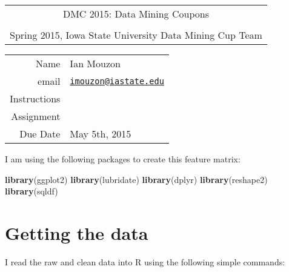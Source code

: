 \documentclass[10pt]{report}
\newenvironment{Shaded}{}{}
\newcommand{\KeywordTok}[1]{\textcolor[rgb]{0.00,0.44,0.13}{\textbf{{#1}}}}
\newcommand{\NormalTok}[1]{{#1}}
\begin{document}
\thispagestyle{empty}%
\begin{center}%
    \renewcommand{\arraystretch}{1.5}%
    \begin{tabular}{c}%
       \Large{DMC 2015: Data Mining Coupons}\\
       \\
       Spring 2015, Iowa State University Data Mining Cup Team\\
    \end{tabular}
\end{center}

\begin{center}
 \renewcommand{\arraystretch}{1.5}
 \begin{tabular*}{0.65\textwidth}{r@{:\hspace{.3cm}}l}
    \hline
    Name& Ian Mouzon\\
    email& \href{mailto:imouzon@iastate.edu}{\nolinkurl{imouzon@iastate.edu}}\\
    Instructions& \\
    Assignment& \\
    Due Date&  May 5th, 2015\\
    \hline
 \end{tabular*}
\end{center}

I am using the following packages to create this feature matrix:

\begin{Shaded}
\begin{Highlighting}[]
\KeywordTok{library}\NormalTok{(ggplot2)}
\KeywordTok{library}\NormalTok{(lubridate)}
\KeywordTok{library}\NormalTok{(dplyr)}
\KeywordTok{library}\NormalTok{(reshape2)}
\KeywordTok{library}\NormalTok{(sqldf)}
\end{Highlighting}
\end{Shaded}

\section{Getting the data}\label{getting-the-data}

I read the raw and clean data into R using the following simple
commands:
\end{document}
